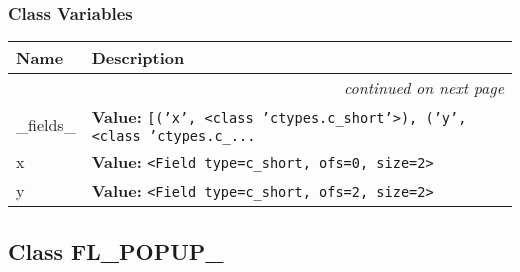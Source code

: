 
  \subsubsection{Class Variables}

    \vspace{-1cm}
\hspace{\varindent}\begin{longtable}{|p{\varnamewidth}|p{\vardescrwidth}|l}
\cline{1-2}
\cline{1-2} \centering \textbf{Name} & \centering \textbf{Description}& \\
\cline{1-2}
\endhead\cline{1-2}\multicolumn{3}{r}{\small\textit{continued on next page}}\\\endfoot\cline{1-2}
\endlastfoot\raggedright \_\-f\-i\-e\-l\-d\-s\-\_\- & \raggedright \textbf{Value:} 
{\tt \texttt{[}\texttt{(}\texttt{'}\texttt{x}\texttt{'}\texttt{, }{\textless}class 'ctypes.c\_short'{\textgreater}\texttt{)}\texttt{, }\texttt{(}\texttt{'}\texttt{y}\texttt{'}\texttt{, }{\textless}class 'ctypes.c\_\texttt{...}}&\\
\cline{1-2}
\raggedright x\- & \raggedright \textbf{Value:} 
{\tt {\textless}Field type=c\_short, ofs=0, size=2{\textgreater}}&\\
\cline{1-2}
\raggedright y\- & \raggedright \textbf{Value:} 
{\tt {\textless}Field type=c\_short, ofs=2, size=2{\textgreater}}&\\
\cline{1-2}
\end{longtable}



\subsection{Class FL\_POPUP\_}

